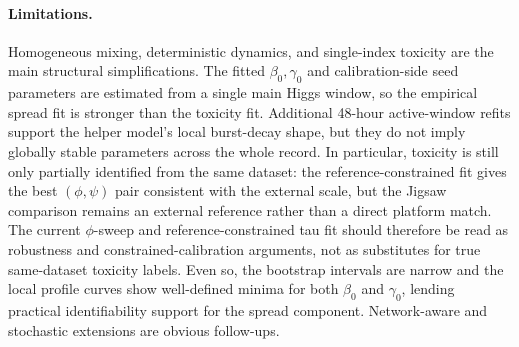 \documentclass[11pt]{article}
\begin{document}
\paragraph{Limitations.}
Homogeneous mixing, deterministic dynamics, and single-index toxicity are the main structural simplifications.
The fitted $\beta_0,\gamma_0$ and calibration-side seed parameters are estimated from a single main Higgs window, so the empirical spread fit is stronger than the toxicity fit. Additional 48-hour active-window refits support the helper model's local burst-decay shape, but they do not imply globally stable parameters across the whole record. In particular, toxicity is still only partially identified from the same dataset: the reference-constrained fit gives the best $(\phi,\psi)$ pair consistent with the external scale, but the Jigsaw comparison remains an external reference rather than a direct platform match. The current $\phi$-sweep and reference-constrained tau fit should therefore be read as robustness and constrained-calibration arguments, not as substitutes for true same-dataset toxicity labels. Even so, the bootstrap intervals are narrow and the local profile curves show well-defined minima for both $\beta_0$ and $\gamma_0$, lending practical identifiability support for the spread component.
Network-aware and stochastic extensions are obvious follow-ups.
\end{document}

